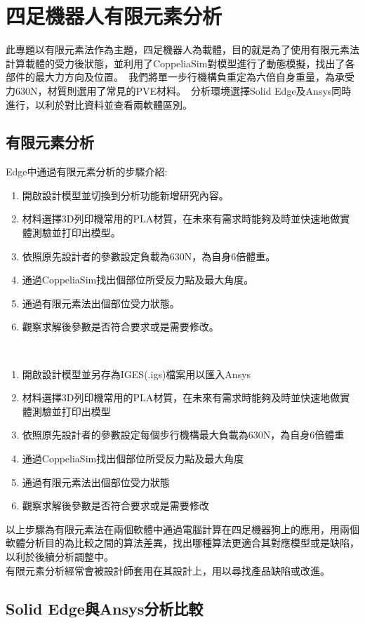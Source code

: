 \chapter{四足機器人有限元素分析}

此專題以有限元素法作為主題，四足機器人為載體，目的就是為了使用有限元素法計算載體的受力後狀態，並利用了CoppeliaSim對模型進行了動態模擬，找出了各部件的最大力方向及位置。\
我們將單一步行機構負重定為六倍自身重量，為承受力630N，材質則選用了常見的PVE材料。\
分析環境選擇Solid Edge及Ansys同時進行，以利於對比資料並查看兩軟體區別。\\

\section{有限元素分析}
\begin{itenize}
 Edge中通過有限元素分析的步驟介紹:
\end{itenize}
\begin{enumerate}
\item 開啟設計模型並切換到分析功能新增研究內容。
\item 材料選擇3D列印機常用的PLA材質，在未來有需求時能夠及時並快速地做實體測驗並打印出模型。
\item 依照原先設計者的參數設定負載為630N，為自身6倍體重。
\item 通過CoppeliaSim找出個部位所受反力點及最大角度。
\item 通過有限元素法出個部位受力狀態。
\item 觀察求解後參數是否符合要求或是需要修改。
\end {enumerate}

\begin{itenize}
\
\end{itenize}
\begin{enumerate}
\item 開啟設計模型並另存為IGES(.igs)檔案用以匯入Ansys
\item 材料選擇3D列印機常用的PLA材質，在未來有需求時能夠及時並快速地做實體測驗並打印出模型
\item 依照原先設計者的參數設定每個步行機構最大負載為630N，為自身6倍體重
\item 通過CoppeliaSim找出個部位所受反力點及最大角度
\item 通過有限元素法出個部位受力狀態
\item 觀察求解後參數是否符合要求或是需要修改
\end{enumerate}

以上步驟為有限元素法在兩個軟體中通過電腦計算在四足機器狗上的應用，用兩個軟體分析目的為比較之間的算法差異，找出哪種算法更適合其對應模型或是缺陷，以利於後續分析調整中。\\
有限元素分析經常會被設計師套用在其設計上，用以尋找產品缺陷或改進。\\

\newpage

\section{Solid Edge與Ansys分析比較}

\newpage
